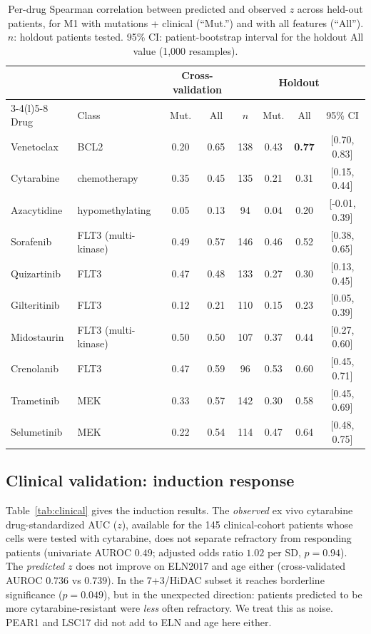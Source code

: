 \documentclass[11pt,logo,nonumbering]{preprint}
\newcommand{\z}{z}
\begin{document}
\begin{table}[ht]
\small
\centering
\caption{Per-drug Spearman correlation between predicted and observed $\z$ across held-out patients, for M1 with mutations + clinical (``Mut.'') and with all features (``All''). $n$: holdout patients tested. 95\% CI: patient-bootstrap interval for the holdout All value (1{,}000 resamples).}
\label{tab:drugs}
\begin{tabular}{@{}llcccccc@{}}
\toprule
 & & \multicolumn{2}{c}{Cross-validation} & \multicolumn{4}{c}{Holdout}\\
\cmidrule(lr){3-4}\cmidrule(l){5-8}
Drug & Class & Mut. & All & $n$ & Mut. & All & 95\% CI\\
\midrule
\rowcolor{lightblue} Venetoclax & BCL2 & 0.20 & 0.65 & 138 & 0.43 & \textbf{0.77} & [0.70, 0.83]\\
Cytarabine & chemotherapy & 0.35 & 0.45 & 135 & 0.21 & 0.31 & [0.15, 0.44]\\
Azacytidine & hypomethylating & 0.05 & 0.13 & 94 & 0.04 & 0.20 & [-0.01, 0.39]\\
Sorafenib & FLT3 (multi-kinase) & 0.49 & 0.57 & 146 & 0.46 & 0.52 & [0.38, 0.65]\\
Quizartinib & FLT3 & 0.47 & 0.48 & 133 & 0.27 & 0.30 & [0.13, 0.45]\\
Gilteritinib & FLT3 & 0.12 & 0.21 & 110 & 0.15 & 0.23 & [0.05, 0.39]\\
Midostaurin & FLT3 (multi-kinase) & 0.50 & 0.50 & 107 & 0.37 & 0.44 & [0.27, 0.60]\\
Crenolanib & FLT3 & 0.47 & 0.59 & 96 & 0.53 & 0.60 & [0.45, 0.71]\\
Trametinib & MEK & 0.33 & 0.57 & 142 & 0.30 & 0.58 & [0.45, 0.69]\\
Selumetinib & MEK & 0.22 & 0.54 & 114 & 0.47 & 0.64 & [0.48, 0.75]\\
\bottomrule
\end{tabular}
\end{table}

\subsection{Clinical validation: induction response}
Table~\ref{tab:clinical} gives the induction results. The \emph{observed} ex vivo cytarabine drug-standardized AUC ($\z$), available for the 145 clinical-cohort patients whose cells were tested with cytarabine, does not separate refractory from responding patients (univariate AUROC $0.49$; adjusted odds ratio $1.02$ per SD, $p=0.94$). The \emph{predicted} $\z$ does not improve on ELN2017 and age either (cross-validated AUROC $0.736$ vs $0.739$). In the 7+3/HiDAC subset it reaches borderline significance ($p=0.049$), but in the unexpected direction: patients predicted to be more cytarabine-resistant were \emph{less} often refractory. We treat this as noise. PEAR1 and LSC17 did not add to ELN and age here either.
\end{document}
